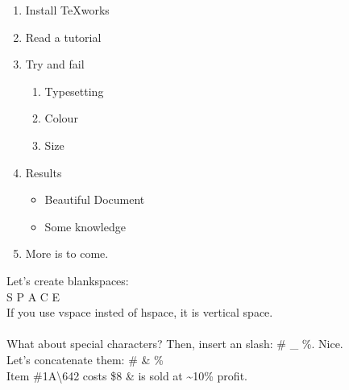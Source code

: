 \documentclass[a4paper,12pt]{article}
\begin{document}
		\begin{enumerate}
			\item Install TeXworks
			\item Read a tutorial
			\item Try and fail
			\begin{enumerate}
				\item Typesetting
				\item Colour
				\item Size
			\end{enumerate}
			\item Results
			\begin{itemize}
				\item Beautiful Document
				\item Some knowledge
			\end{itemize}
			\item More is to come.
		\end{enumerate}


		Let's create blankspaces: \\%
		S \hspace{10pt} P \hspace{40pt} A \hspace{60pt} C \hspace{80pt} E \\
		If you use vspace insted of hspace, it is vertical space.\\
		\\
		What about special characters? Then, insert an slash: \# \_ \%. Nice.\\
		Let's concatenate them: \# \& \%\\
		Item \#1A\textbackslash642 costs \$8 \& is sold at \~{}10\% profit.\\
\end{document}
